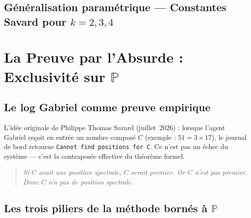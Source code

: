 \documentclass[]{pasj02}
\begin{document}
\subsection{Généralisation paramétrique --- Constantes Savard pour
$k = 2, 3, 4$}
\label{ssec:generalisation_k}
\label{hol:constantes_generalisees}

\begin{table}
  \label{tab:constantes_k}
\end{table}

\section{La Preuve par l'Absurde : Exclusivité sur $\mathbb{P}$}
\label{sec:absurde}

\subsection{Le log Gabriel comme preuve empirique}
\label{ssec:gabriel}

L'idée originale de Philippe Thomas Savard (juillet~2026) : lorsque l'agent
Gabriel reçoit en entrée un nombre composé $C$ (exemple : $51 = 3 \times
17$), le journal de bord retourne \texttt{Cannot find positions for C}.
Ce n'est pas un échec du système --- c'est la contraposée effective du
théorème formel.

\begin{quote}
\emph{Si $C$ avait une position spectrale, $C$ serait premier.  Or $C$
n'est pas premier.  Donc $C$ n'a pas de position spectrale.}
\end{quote}

\subsection{Les trois piliers de la méthode bornés à $\mathbb{P}$}
\label{ssec:trois_piliers}
\label{hol:trois_piliers}
\end{document}
